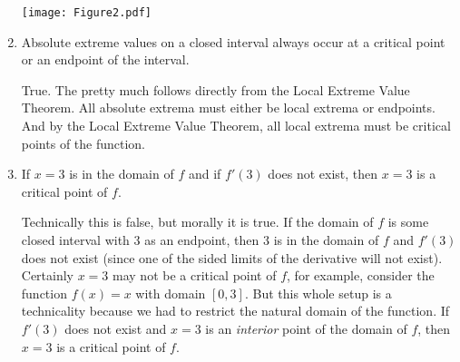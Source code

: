 \documentclass[nooutcomes]{ximera}
\begin{document}
\begin{problem}
\begin{enumerate}
\begin{freeResponse}
		\begin{image}
		\texttt{[image: Figure2.pdf]}
		\end{image}
		
		\end{freeResponse}	
		
		
		
	\item  Absolute extreme values on a closed interval always occur at a critical point or an endpoint of the interval.
		\begin{freeResponse}
		True.  The pretty much follows directly from the Local Extreme Value Theorem.  All absolute extrema must either be local extrema or endpoints.  And by the Local Extreme Value Theorem, all local extrema must be critical points of the function.  
		\end{freeResponse}	
		
		
		
	\item  If $x=3$ is in the domain of $f$ and if $f'(3)$ does not exist, then $x=3$ is a critical point of $f$.
		\begin{freeResponse}
		Technically this is false, but morally it is true.  If the domain of $f$ is some closed interval with $3$ as an endpoint, then $3$ is in the domain of $f$ and $f'(3)$ does not exist (since one of the sided limits of the derivative will not exist).  Certainly $x=3$ may not be a critical point of $f$, for example, consider the function $f(x) = x$ with domain $[0,3]$.  But this whole setup is a technicality because we had to restrict the natural domain of the function.  If $f'(3)$ does not exist and $x=3$ is an \emph{interior} point of the domain of $f$, then $x=3$ is a critical point of $f$.  
		\end{freeResponse}	
		
		
		
	\end{enumerate}
		
\end{problem}	
		
\end{document}

